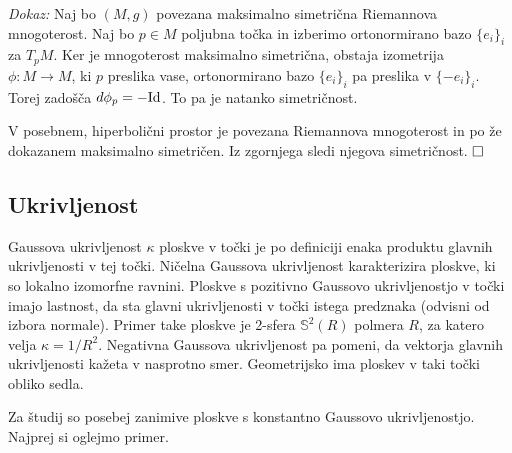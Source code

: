 \documentclass[a4paper]{article}
\def\qed{$\hfill\Box$}   %
\begin{document}
\noindent
{\em Dokaz:\/} 
Naj bo $(M,g)$ povezana maksimalno simetrična Riemannova mnogoterost. Naj bo $p \in M$ poljubna točka in izberimo ortonormirano bazo $\{ e_{i} \}_{i}$ za $T_{p}M$. Ker je mnogoterost maksimalno simetrična, obstaja izometrija $\phi \colon M \to M$, ki $p$ preslika vase, ortonormirano bazo $\{e_{i} \}_{i}$ pa preslika v $\{ -e_{i} \}_{i}$. Torej zadošča $d\phi_{p} = -\textup{Id}$. To pa je natanko simetričnost.

V posebnem, hiperbolični prostor je povezana Riemannova mnogoterost in po že dokazanem maksimalno simetričen. Iz zgornjega sledi njegova simetričnost. 
\qed

\subsection{Ukrivljenost}

Gaussova ukrivljenost $\kappa$ ploskve v točki je po definiciji enaka produktu glavnih ukrivljenosti v tej točki. 
Ničelna Gaussova ukrivljenost karakterizira ploskve, ki so lokalno izomorfne ravnini.
Ploskve s pozitivno Gaussovo ukrivljenostjo v točki imajo lastnost, da sta glavni ukrivljenosti v točki istega predznaka (odvisni od izbora normale). Primer take ploskve je 2-sfera $\mathbb{S}^{2}(R)$ polmera $R$, za katero velja $\kappa = 1/R^2$. 
Negativna Gaussova ukrivljenost pa pomeni, da vektorja glavnih ukrivljenosti kažeta v nasprotno smer. Geometrijsko ima ploskev v taki točki obliko sedla. 

Za študij so posebej zanimive ploskve s konstantno Gaussovo ukrivljenostjo. Najprej si oglejmo primer.
\end{document}
